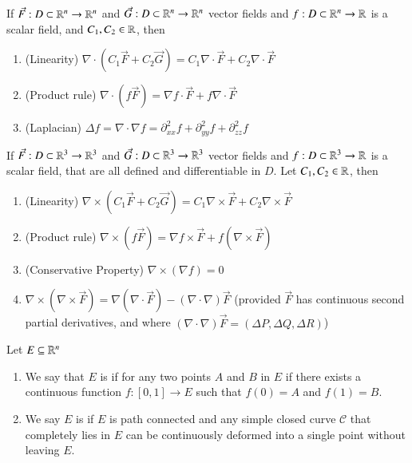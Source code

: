 \begin{appendices}
    \begin{prop}
        If $\vec{F}:D\subset \mathbb R^n \rightarrow \mathbb R^n$ and $\vec{G}:D\subset \mathbb R^n \rightarrow \mathbb R^n$ vector fields and $f:D\subset \mathbb R^n \rightarrow \mathbb R$ is a scalar field, and $C_1,C_2 \in \mathbb R$, then \begin{enumerate}
            \item (Linearity) $\nabla \cdot (C_1\vec{F} + C_2\vec{G}) = C_1\nabla \cdot \vec{F} + C_2\nabla \cdot \vec{F}$
            \item (Product rule) $\nabla \cdot (f\vec{F}) = \nabla f \cdot \vec{F} + f\nabla\cdot \vec{F}$
            \item (Laplacian) $\Delta f = \nabla \cdot \nabla f = \partial_{xx}^2f + \partial_{yy}^2f + \partial_{zz}^2f$
        \end{enumerate}
    \end{prop}
    
    \begin{prop}
        If $\vec{F}:D\subset \mathbb R^3 \rightarrow \mathbb R^3$ and $\vec{G}:D\subset \mathbb R^3 \rightarrow \mathbb R^3$ vector fields and $f:D\subset \mathbb R^3 \rightarrow \mathbb R$ is a scalar field, that are all defined and differentiable in $D$. Let $C_1,C_2 \in \mathbb R$, then \begin{enumerate}
            \item (Linearity) $\nabla \times (C_1\vec{F} + C_2\vec{G}) = C_1\nabla \times \vec{F} + C_2\nabla \times \vec{F}$
            \item (Product rule) $\nabla \times (f\vec{F}) = \nabla f \times \vec{F} + f(\nabla\times \vec{F})$
            \item (Conservative Property) $\nabla \times (\nabla f) = 0$
            \item $\nabla \times(\nabla \times \vec{F}) = \nabla(\nabla\cdot \vec{F}) - (\nabla \cdot \nabla)\vec{F}$ (provided $\vec{F}$ has continuous second partial derivatives, and where $(\nabla \cdot \nabla)\vec{F} = (\Delta P, \Delta Q, \Delta R)$)
        \end{enumerate}
    \end{prop}
    
    \begin{defn}
        Let $E \subseteq \mathbb R^n$ \begin{enumerate}
            \item We say that $E$ is  if for any two points $A$ and $B$ in $E$ if there exists a continuous function $f:[0,1] \rightarrow E$ such that $f(0) = A$ and $f(1) = B$.
            \item We say $E$ is  if $E$ is path connected and any simple closed curve $\mathcal{C}$ that completely lies in $E$ can be continuously deformed into a single point without leaving $E$.
        \end{enumerate}
    \end{defn}
    

\end{appendices}
